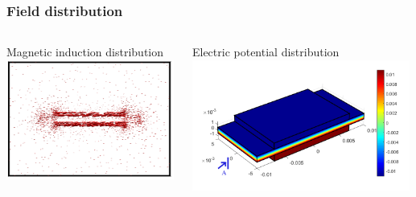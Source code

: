 \documentclass[compress]{beamer}
\begin{document}
\begin{frame}\frametitle{Field distribution}
\begin{columns}[totalwidth=\textwidth]
 \begin{column}{.5\textwidth}
 \centering
 Magnetic induction distribution
 \includegraphics[height=0.8\textwidth, width=0.99\textwidth]{Graphic/03_MErectamagnefluxXZview}
 \end{column}
 \begin{column}{.5\textwidth}
 \centering
 Electric potential distribution
 \includegraphics[height=0.8\textwidth, width=0.99\textwidth]{Graphic/03_MErectaelecpoten3d}
  \end{column}
\end{columns}
\end{frame}
\end{document}
